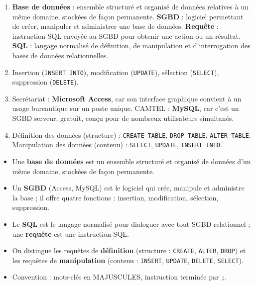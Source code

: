 \documentclass[11pt]{article}
\begin{document}
\begin{corrige}[Exercice 1]
\begin{enumerate}
\item \textbf{Base de données} : ensemble structuré et organisé de données relatives à un même domaine, stockées de façon permanente. \textbf{SGBD} : logiciel permettant de créer, manipuler et administrer une base de données. \textbf{Requête} : instruction SQL envoyée au SGBD pour obtenir une action ou un résultat. \textbf{SQL} : langage normalisé de définition, de manipulation et d'interrogation des bases de données relationnelles.
\item Insertion (\texttt{INSERT INTO}), modification (\texttt{UPDATE}), sélection (\texttt{SELECT}), suppression (\texttt{DELETE}).
\item Secrétariat : \textbf{Microsoft Access}, car son interface graphique convient à un usage bureautique sur un poste unique. CAMTEL : \textbf{MySQL}, car c'est un SGBD serveur, gratuit, conçu pour de nombreux utilisateurs simultanés.
\item Définition des données (structure) : \texttt{CREATE TABLE}, \texttt{DROP TABLE}, \texttt{ALTER TABLE}. Manipulation des données (contenu) : \texttt{SELECT}, \texttt{UPDATE}, \texttt{INSERT INTO}.
\end{enumerate}
\end{corrige}

\begin{aretenir}
\begin{itemize}
\item Une \textbf{base de données} est un ensemble structuré et organisé de données d'un même domaine, stockées de façon permanente.
\item Un \textbf{SGBD} (Access, MySQL) est le logiciel qui crée, manipule et administre la base ; il offre quatre fonctions : insertion, modification, sélection, suppression.
\item Le \textbf{SQL} est le langage normalisé pour dialoguer avec tout SGBD relationnel ; une \textbf{requête} est une instruction SQL.
\item On distingue les requêtes de \textbf{définition} (structure : \texttt{CREATE}, \texttt{ALTER}, \texttt{DROP}) et les requêtes de \textbf{manipulation} (contenu : \texttt{INSERT}, \texttt{UPDATE}, \texttt{DELETE}, \texttt{SELECT}).
\item Convention : mots-clés en MAJUSCULES, instruction terminée par \texttt{;}.
\end{itemize}
\end{aretenir}
\end{document}
